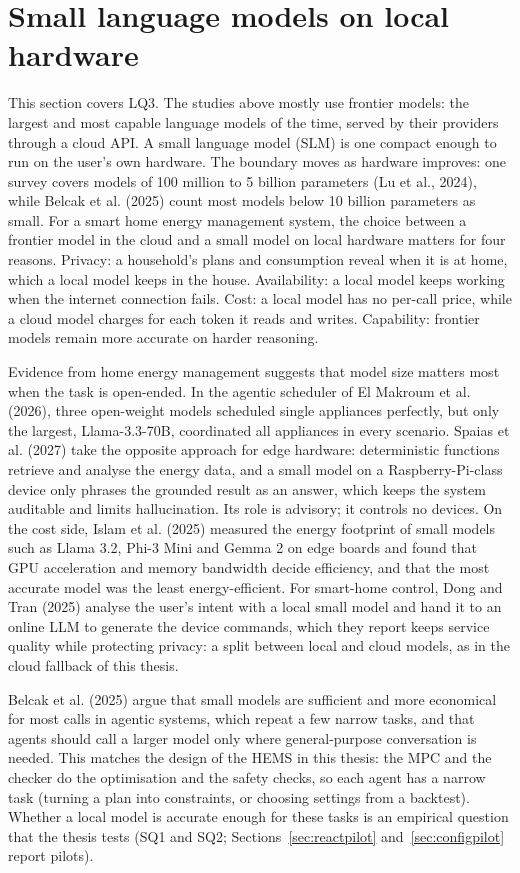 \documentclass[12pt,a4paper]{report}
\begin{document}
\section{Small language models on local hardware}
\label{sec:llmslm}

This section covers LQ3. The studies above mostly use frontier models:
the largest and most
capable language models of the time, served by their providers through a
cloud API. A small language model (SLM) is one compact enough to run on
the user's own hardware. The boundary moves as hardware improves: one
survey covers models of 100 million to 5 billion parameters
(Lu et al., 2024), while Belcak et al. (2025) count most models below
10 billion parameters as small. For a smart home energy management
system, the choice between a frontier model in the cloud and a small
model on local hardware matters for four reasons. Privacy: a household's plans
and consumption reveal when it is at home, which a local model keeps in
the house. Availability: a local model keeps working when the internet
connection fails. Cost: a local model has no per-call price, while a
cloud model charges for each token it reads and writes. Capability:
frontier models remain more accurate on harder reasoning.

Evidence from home energy management suggests that model size matters
most when the task is open-ended. In the agentic scheduler of
El Makroum et al. (2026), three open-weight models scheduled single
appliances perfectly, but only the largest, Llama-3.3-70B, coordinated
all appliances in every scenario. Spaias et al. (2027) take the
opposite approach for edge hardware: deterministic functions retrieve
and analyse the energy data, and a small model on a Raspberry-Pi-class
device only phrases the grounded result as an answer, which keeps the
system auditable and limits hallucination. Its role is advisory; it
controls no devices. On the cost side, Islam et al. (2025) measured
the energy footprint of small models such as Llama 3.2, Phi-3 Mini and
Gemma 2 on edge boards and found that GPU acceleration and memory
bandwidth decide efficiency, and that the most accurate model was the
least energy-efficient. For smart-home control, Dong and Tran (2025)
analyse the user's intent with a local small model and hand it to an
online LLM to generate the device commands, which they report keeps
service quality while protecting privacy: a split between local and
cloud models, as in the cloud fallback of this thesis.

Belcak et al. (2025) argue that small models are sufficient and more
economical for most calls in agentic systems, which repeat a few narrow
tasks, and that agents should call a larger model only where
general-purpose conversation is needed. This matches the design of the
HEMS in this thesis: the MPC and the checker do the optimisation and the safety
checks, so each agent has a narrow task (turning a plan into
constraints, or choosing settings from a backtest). Whether a local
model is accurate enough for these tasks is an empirical question that
the thesis tests (SQ1 and SQ2; Sections~\ref{sec:reactpilot}
and~\ref{sec:configpilot} report pilots).
\end{document}
